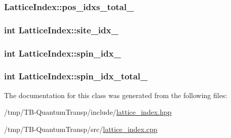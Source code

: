\subsubsection[{\texorpdfstring{pos\+\_\+idxs\+\_\+total\+\_\+}{pos_idxs_total_}}]{ Lattice\+Index\+::pos\+\_\+idxs\+\_\+total\+\_\+\hspace{0.3cm}{\ttfamily [private]}}\hypertarget{classLatticeIndex_a67d044b0460af73e3a08048a875205e1}{}\label{classLatticeIndex_a67d044b0460af73e3a08048a875205e1}
\subsubsection[{\texorpdfstring{site\+\_\+idx\+\_\+}{site_idx_}}]{\setlength{\rightskip}{0pt plus 5cm}int Lattice\+Index\+::site\+\_\+idx\+\_\+\hspace{0.3cm}{\ttfamily [private]}}\hypertarget{classLatticeIndex_a7d2705266979c203e084bc90e390a560}{}\label{classLatticeIndex_a7d2705266979c203e084bc90e390a560}
\subsubsection[{\texorpdfstring{spin\+\_\+idx\+\_\+}{spin_idx_}}]{\setlength{\rightskip}{0pt plus 5cm}int Lattice\+Index\+::spin\+\_\+idx\+\_\+\hspace{0.3cm}{\ttfamily [private]}}\hypertarget{classLatticeIndex_a2f3c684375fb6e0e680565974ba8f859}{}\label{classLatticeIndex_a2f3c684375fb6e0e680565974ba8f859}
\subsubsection[{\texorpdfstring{spin\+\_\+idx\+\_\+total\+\_\+}{spin_idx_total_}}]{\setlength{\rightskip}{0pt plus 5cm}int Lattice\+Index\+::spin\+\_\+idx\+\_\+total\+\_\+\hspace{0.3cm}{\ttfamily [private]}}\hypertarget{classLatticeIndex_a01b6edc3bd72a168b1faf3782a86f69c}{}\label{classLatticeIndex_a01b6edc3bd72a168b1faf3782a86f69c}


The documentation for this class was generated from the following files\+:\begin{DoxyCompactItemize}
\item 
/tmp/\+T\+B-\/\+Quantum\+Transp/include/\hyperlink{lattice__index_8hpp}{lattice\+\_\+index.\+hpp}\item 
/tmp/\+T\+B-\/\+Quantum\+Transp/src/\hyperlink{lattice__index_8cpp}{lattice\+\_\+index.\+cpp}\end{DoxyCompactItemize}
